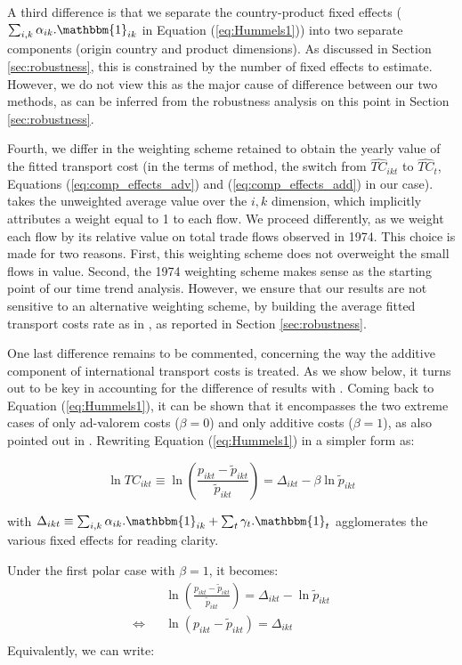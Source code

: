 \documentclass[a4paper,11pt]{article}
\begin{document}
A third difference is that we separate the country-product fixed effects ($\sum_{i,k}\alpha_{ik}.\mathbbm{1}_{ik}$ in Equation (\ref{eq:Hummels1})) into two separate components (origin country and product dimensions).
As discussed in Section \ref{sec:robustness}, this is constrained by the number of fixed effects to estimate.
However, we do not view this as the major cause of difference between our two methods, as can be inferred from the robustness analysis on this point in Section \ref{sec:robustness}.

Fourth, we differ in the weighting scheme retained to obtain the yearly value of the fitted transport cost (in the terms of \cite{hummels2007} method, the switch from $\widehat{TC}_{ikt}$ to $\widehat{TC}_{t}$, Equations (\ref{eq:comp_effects_adv}) and (\ref{eq:comp_effects_add}) in our case).
\cite{hummels2007} takes the unweighted average value over the $i,k$ dimension, which implicitly attributes a weight equal to 1 to each flow.
We proceed differently, as we weight each flow by its relative value on total trade flows observed in 1974.
This choice is made for two reasons.
First, this weighting scheme does not overweight the small flows in value.
Second, the 1974 weighting scheme makes sense as the starting point of our time trend analysis.
However, we ensure that our results are not sensitive to an alternative weighting scheme, by building the average fitted transport costs rate as in \cite{hummels2007}, as reported in Section \ref{sec:robustness}.

One last difference remains to be commented, concerning the way the additive component of international transport costs is treated.
As we show below, it turns out to be key in accounting for the difference of results with \cite{hummels2007}.
Coming back to Equation (\ref{eq:Hummels1}), it can be shown that it encompasses the two extreme cases of only ad-valorem costs ($\beta = 0$) and only additive costs ($\beta=1$), as also pointed out in \cite{hummels_skiba}. Rewriting Equation (\ref{eq:Hummels1}) in a simpler form as:

$$\ln TC_{ikt} \equiv \ln \left(\frac{p_{ikt}- \widetilde{p}_{ikt}}{\widetilde{p}_{ikt}} \right) = \Delta_{ikt}- \beta \ln \widetilde{p}_{ikt} $$

\noindent with $\Delta_{ikt} \equiv \sum_{i,k}\alpha_{ik}.\mathbbm{1}_{ik}+ \sum_{t}\gamma_{t}.\mathbbm{1}_{t}$ agglomerates the various fixed effects for reading clarity.

Under the first polar case with $\beta = 1$, it becomes:
\begin{eqnarray*}
&&\ln \left(\frac{p_{ikt}- \widetilde{p}_{ikt}}{\widetilde{p}_{ikt}} \right) = \Delta_{ikt}- \ln \widetilde{p}_{ikt} \\
\Leftrightarrow && \ln (p_{ikt}- \widetilde{p}_{ikt}) = \Delta_{ikt} \\
\end{eqnarray*}
\noindent Equivalently, we can write:
\end{document}
